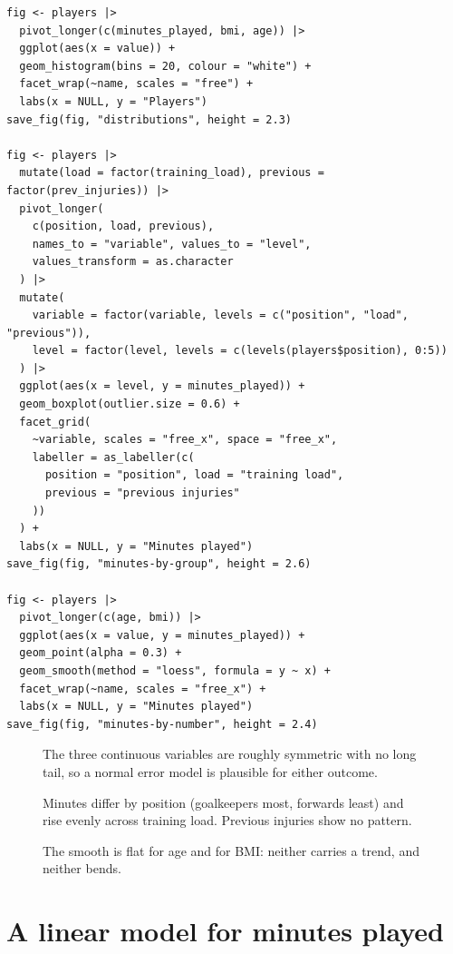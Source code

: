\documentclass[12pt,notitlepage]{report}
\begin{document}
\begin{verbatim}
fig <- players |>
  pivot_longer(c(minutes_played, bmi, age)) |>
  ggplot(aes(x = value)) +
  geom_histogram(bins = 20, colour = "white") +
  facet_wrap(~name, scales = "free") +
  labs(x = NULL, y = "Players")
save_fig(fig, "distributions", height = 2.3)

fig <- players |>
  mutate(load = factor(training_load), previous = factor(prev_injuries)) |>
  pivot_longer(
    c(position, load, previous),
    names_to = "variable", values_to = "level",
    values_transform = as.character
  ) |>
  mutate(
    variable = factor(variable, levels = c("position", "load", "previous")),
    level = factor(level, levels = c(levels(players$position), 0:5))
  ) |>
  ggplot(aes(x = level, y = minutes_played)) +
  geom_boxplot(outlier.size = 0.6) +
  facet_grid(
    ~variable, scales = "free_x", space = "free_x",
    labeller = as_labeller(c(
      position = "position", load = "training load",
      previous = "previous injuries"
    ))
  ) +
  labs(x = NULL, y = "Minutes played")
save_fig(fig, "minutes-by-group", height = 2.6)

fig <- players |>
  pivot_longer(c(age, bmi)) |>
  ggplot(aes(x = value, y = minutes_played)) +
  geom_point(alpha = 0.3) +
  geom_smooth(method = "loess", formula = y ~ x) +
  facet_wrap(~name, scales = "free_x") +
  labs(x = NULL, y = "Minutes played")
save_fig(fig, "minutes-by-number", height = 2.4)
\end{verbatim}

\begin{figure}[H]
  \centering
  \caption{The three continuous variables are roughly symmetric with no long
    tail, so a normal error model is plausible for either outcome.}
\end{figure}

\begin{figure}[H]
  \centering
  \caption{Minutes differ by position (goalkeepers most, forwards least) and
    rise evenly across training load. Previous injuries show no pattern.}
  \label{fig:groups}
\end{figure}

\begin{figure}[H]
  \centering
  \caption{The smooth is flat for age and for BMI: neither carries a trend,
    and neither bends.}
\end{figure}

\section{A linear model for minutes played}
\end{document}
